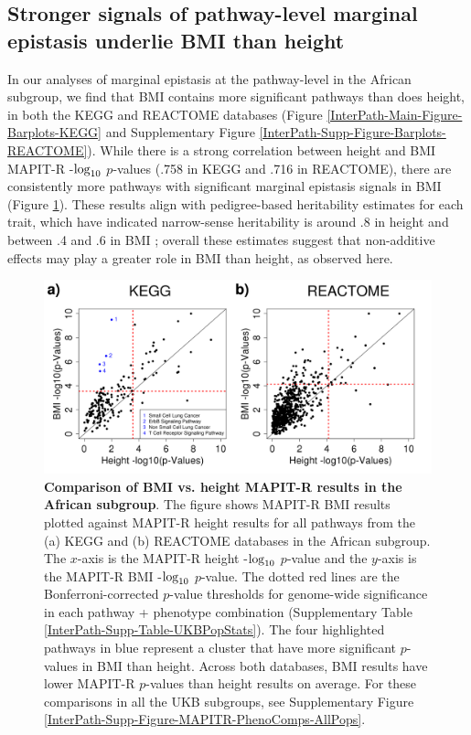 \documentclass[12pt,a4paper]{article}
\def\log{{\rm log}}
\begin{document}
\subsection{Stronger signals of pathway-level marginal epistasis underlie BMI than height}

In our analyses of marginal epistasis at the pathway-level in the African subgroup, we find that BMI contains more significant pathways than does height, in both the KEGG and REACTOME databases (Figure \ref{InterPath-Main-Figure-Barplots-KEGG} and Supplementary Figure \ref{InterPath-Supp-Figure-Barplots-REACTOME}). While there is a strong correlation between height and BMI MAPIT-R -$\log_{10}$ $p$-values (.758 in KEGG and .716 in REACTOME), there are consistently more pathways with significant marginal epistasis signals in BMI (Figure \ref{InterPath-Main-Figure-MAPITR-PhenoComps-African}). These results align with pedigree-based heritability estimates for each trait, which have indicated narrow-sense heritability is around .8 in height and between .4 and .6 in BMI \citep{Elks2012,Visscher2012}; overall these estimates suggest that non-additive effects may play a greater role in BMI than height, as observed here. 

\begin{figure}[htb]
\centering
\includegraphics[scale=.45]{Images/Main/InterPath_Main_Figure_MAPITR_PhenoComps_African_vs4_legend.png}
\caption[TBD]{\textbf{Comparison of BMI vs. height MAPIT-R results in the African subgroup}. The figure shows MAPIT-R BMI results plotted against MAPIT-R height results for all pathways from the (a) KEGG and (b) REACTOME databases in the African subgroup. The $x$-axis is the MAPIT-R height -$\log_{10}$ $p$-value and the $y$-axis is the MAPIT-R BMI -$\log_{10}$ $p$-value. The dotted red lines are the Bonferroni-corrected $p$-value thresholds for genome-wide significance in each pathway + phenotype combination (Supplementary Table \ref{InterPath-Supp-Table-UKBPopStats}). The four highlighted pathways in blue represent a cluster that have more significant $p$-values in BMI than height. Across both databases, BMI results have lower MAPIT-R $p$-values than height results on average. For these comparisons in all the UKB subgroups, see Supplementary Figure \ref{InterPath-Supp-Figure-MAPITR-PhenoComps-AllPops}.}
\label{InterPath-Main-Figure-MAPITR-PhenoComps-African}
\end{figure}
\end{document}
